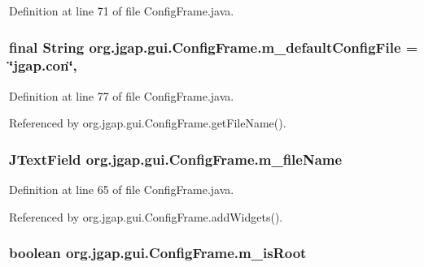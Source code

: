 Definition at line 71 of file Config\-Frame.\-java.

\hypertarget{classorg_1_1jgap_1_1gui_1_1_config_frame_a9c341c8f6c764d874e702d78a940961c}{
\subsubsection[{m\-\_\-default\-Config\-File}]{\setlength{\rightskip}{0pt plus 5cm}final String org.\-jgap.\-gui.\-Config\-Frame.\-m\-\_\-default\-Config\-File = \char`\"{}jgap.\-con\char`\"{}\hspace{0.3cm}{\ttfamily [static]}, {\ttfamily [private]}}}\label{classorg_1_1jgap_1_1gui_1_1_config_frame_a9c341c8f6c764d874e702d78a940961c}


Definition at line 77 of file Config\-Frame.\-java.



Referenced by org.\-jgap.\-gui.\-Config\-Frame.\-get\-File\-Name().

\hypertarget{classorg_1_1jgap_1_1gui_1_1_config_frame_a8f91d29f5afe91acc604fc56e9b49137}{
\subsubsection[{m\-\_\-file\-Name}]{\setlength{\rightskip}{0pt plus 5cm}J\-Text\-Field org.\-jgap.\-gui.\-Config\-Frame.\-m\-\_\-file\-Name\hspace{0.3cm}{\ttfamily [private]}}}\label{classorg_1_1jgap_1_1gui_1_1_config_frame_a8f91d29f5afe91acc604fc56e9b49137}


Definition at line 65 of file Config\-Frame.\-java.



Referenced by org.\-jgap.\-gui.\-Config\-Frame.\-add\-Widgets().

\hypertarget{classorg_1_1jgap_1_1gui_1_1_config_frame_a878f1ba120803abd6d1c0409c680a12a}{
\subsubsection[{m\-\_\-is\-Root}]{\setlength{\rightskip}{0pt plus 5cm}boolean org.\-jgap.\-gui.\-Config\-Frame.\-m\-\_\-is\-Root\hspace{0.3cm}{\ttfamily [private]}}}\label{classorg_1_1jgap_1_1gui_1_1_config_frame_a878f1ba120803abd6d1c0409c680a12a}


